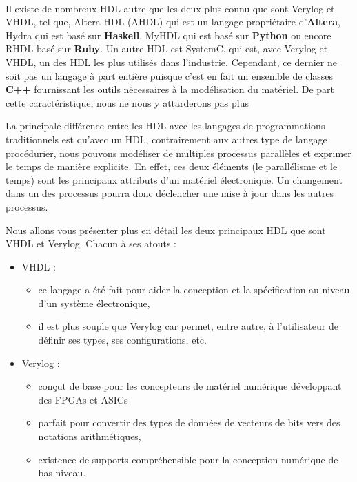 \\
\par
Il existe de nombreux HDL autre que les deux plus connu que sont Verylog et VHDL, tel que, Altera HDL (AHDL) qui est un langage propriétaire d'\textbf{Altera}, Hydra qui est basé sur \textbf{Haskell}, MyHDL qui est basé sur \textbf{Python} ou encore RHDL basé sur \textbf{Ruby}. Un autre HDL est SystemC, qui est, avec Verylog et VHDL, un des HDL les plus utilisés dans l'industrie. Cependant, ce dernier ne soit pas un langage à part entière puisque c'est en fait un ensemble de classes \textbf{C++} fournissant les outils nécessaires à la modélisation du matériel. De part cette caractéristique, nous ne nous y attarderons pas plus
\\
\par
La principale différence entre les HDL avec les langages de programmations traditionnels est qu'avec un HDL, contrairement aux autres type de langage procédurier, nous pouvons modéliser de multiples processus parallèles et exprimer le temps de manière explicite. En effet, ces deux éléments (le parallélisme et le temps) sont les principaux attributs d'un matériel électronique. Un changement dans un des processus pourra donc déclencher une mise à jour dans les autres processus.
\\
\par
Nous allons vous présenter plus en détail les deux principaux HDL que sont VHDL et Verylog. Chacun à ses atouts :
\begin{itemize}
\item VHDL :
\begin{itemize}
\item ce langage a été fait pour aider la conception et la spécification au niveau d'un système électronique,
\item il est plus souple que Verylog car permet, entre autre, à l'utilisateur de définir ses types, ses configurations, etc.
\end{itemize}
\item Verylog :
\begin{itemize}
\item conçut de base pour les concepteurs de matériel numérique développant des FPGAs et ASICs
\item parfait pour convertir des types de données de vecteurs de bits vers des notations arithmétiques,
\item existence de supports compréhensible pour la conception numérique de bas niveau.
\end{itemize}
\end{itemize}
